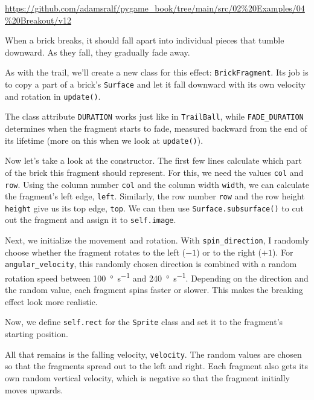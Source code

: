 \begin{diskbox}
	\url{https://github.com/adamsralf/pygame_book/tree/main/src/02%20Examples/04%20Breakout/v12}
\end{diskbox}

	When a brick breaks, it should fall apart into individual pieces that tumble downward. As they fall, they gradually fade away.
\er

As with the trail, we'll create a new class for this effect: \texttt{BrickFragment}. Its job is to copy a part of a brick's \texttt{Surface} and let it fall downward with its own velocity and rotation in \texttt{update()}.

The class attribute \texttt{DURATION} works just like in \texttt{TrailBall}, while \texttt{FADE\_DURATION} determines when the fragment starts to fade, measured backward from the end of its lifetime (more on this when we look at \texttt{update()}).

Now let's take a look at the constructor. The first few lines calculate which part of the brick this fragment should represent. For this, we need the values \texttt{col} and \texttt{row}. Using the column number \texttt{col} and the column width \texttt{width}, we can calculate the fragment's left edge, \texttt{left}. Similarly, the row number \texttt{row} and the row height \texttt{height} give us its top edge, \texttt{top}. We can then use \texttt{Surface.subsurface()} to cut out the fragment and assign it to \texttt{self.image}.

Next, we initialize the movement and rotation. With \texttt{spin\_direction}, I randomly choose whether the fragment rotates to the left ($-1$) or to the right ($+1$). For \texttt{angular\-\_velocity}, this randomly chosen direction is combined with a random rotation speed between \SI{100}{\degree\per\second} and \SI{240}{\degree\per\second}. Depending on the direction and the random value, each fragment spins faster or slower. This makes the breaking effect look more realistic.

Now, we define \texttt{self.rect} for the \texttt{Sprite} class and set it to the fragment's starting position.

All that remains is the falling velocity, \texttt{velocity}. The random values are chosen so that the fragments spread out to the left and right. Each fragment also gets its own random vertical velocity, which is negative so that the fragment initially moves upwards.

